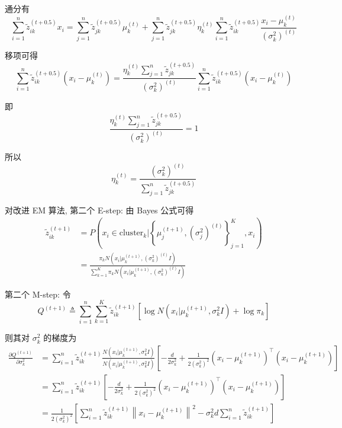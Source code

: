 \documentclass[openany]{ctexbook}
\theoremstyle{kaiti}
\theoremstyle{normal}
\begin{document}
通分有
\begin{equation}
  \sum_{i=1}^n\tilde{z}_{ik}^{(t+0.5)}x_i
  =\sum_{j=1}^n\tilde{z}_{jk}^{(t+0.5)}\mu_k^{(t)}+\sum_{j=1}^n\tilde{z}_{jk}^{(t+0.5)}\eta_k^{(t)}\sum_{i=1}^n\tilde{z}_{ik}^{(t+0.5)}\frac{x_i-\mu_k^{(t)}}{(\sigma_k ^2)^{(t)}}
\end{equation}

移项可得
\begin{equation}
  \sum_{i=1}^n\tilde{z}_{ik}^{(t+0.5)}\left(x_i-\mu_k^{(t)}\right)
  =\frac{\eta_k^{(t)}\displaystyle\sum_{j=1}^n\tilde{z}_{jk}^{(t+0.5)}}{(\sigma_k ^2)^{(t)}}\sum_{i=1}^n\tilde{z}_{ik}^{(t+0.5)}\left(x_i-\mu_k^{(t)}\right)
\end{equation}

即
\begin{equation}
  \frac{\eta_k^{(t)}\displaystyle\sum_{j=1}^n\tilde{z}_{jk}^{(t+0.5)}}{(\sigma_k ^2)^{(t)}}=1
\end{equation}

所以
\begin{equation}
  \eta_k^{(t)}=\frac{(\sigma_k ^2)^{(t)}}{\displaystyle\sum_{j=1}^n\tilde{z}_{jk}^{(t+0.5)}}
\end{equation}

对改进 EM 算法, 第二个 E-step: 由 Bayes 公式可得
\begin{equation}
  \begin{aligned}
    \tilde{z}_{ik}^{(t+1)} 
    &=P\left(x_i\in \mathrm{cluster}_k \Big| \left\{\mu_j^{(t+1)},(\sigma_j^2)^{(t)}\right\}_{j=1}^K,x_i\right)\\
    &=\frac{\pi_k N\left(x_i\Big|\mu_k^{(t+1)},(\sigma_k^2)^{(t)}I\right)}{\displaystyle\sum_{k=1}^K\pi_k N\left(x_i\Big|\mu_k^{(t+1)},(\sigma_k^2)^{(t)}I\right)}
  \end{aligned}
\end{equation}

第二个 M-step: 令
\begin{equation}
    Q^{(t+1)}\triangleq\sum_{i=1}^n\sum_{k=1}^K \tilde{z}_{ik}^{(t+1)} \left[\log N\left(x_i\Big|\mu_k^{(t+1)},\sigma_k^2I\right)+\log\pi_k\right]
\end{equation}

则其对 $\sigma_k^2$ 的梯度为
\begin{equation}
  \begin{aligned}
    \frac{\partial Q^{(t+1)}}{\partial \sigma_k^2}
    &=\sum_{i=1}^n\tilde{z}_{ik}^{(t+1)}\frac{N\left(x_i\Big|\mu_k^{(t+1)},\sigma_k^2I\right)}{N\left(x_i\Big|\mu_k^{(t+1)},\sigma_k^2I\right)}\left[-\frac{d}{2\sigma_k^2}+\frac{1}{2(\sigma_k^2)^2}\left(x_i-\mu_k^{(t+1)}\right)^{\top}\left(x_i-\mu_k^{(t+1)}\right)\right]\\
    &=\sum_{i=1}^n\tilde{z}_{ik}^{(t+1)}\left[-\frac{d}{2\sigma_k^2}+\frac{1}{2(\sigma_k^2)^2}\left(x_i-\mu_k^{(t+1)}\right)^{\top}\left(x_i-\mu_k^{(t+1)}\right)\right]\\
    &=\frac{1}{2(\sigma_k^2)^2}\left[\sum_{i=1}^n\tilde{z}_{ik}^{(t+1)}\left\|x_i-\mu_k^{(t+1)}\right\|^2-\sigma_k^2d\sum_{i=1}^n\tilde{z}_{ik}^{(t+1)}\right]
  \end{aligned}
\end{equation}
\end{document}
